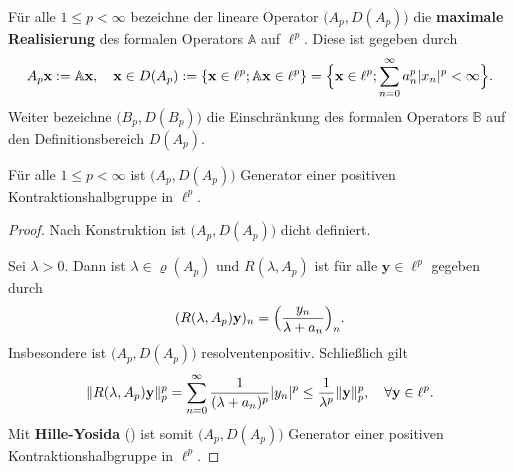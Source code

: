 \begin{defi}
Für alle $1\leq p<\infty$ bezeichne der lineare Operator $\big(A_p, D(A_p)\big)$  %
die \textbf{maximale Realisierung}  des formalen Operators $\mathbb A$ auf $\ell^p$.
Diese ist gegeben durch
\begin{equation*}
A_p\textbf{x}:= \mathbb A\textbf{x}, \quad \textbf{x}\in D(A_p):= \{\textnormal{\textbf{x}}\in \ell^p; \mathbb A\textnormal{\textbf{x}}\in \ell^p\}=\Big\{\textnormal{\textbf{x}}\in \ell^p; \sum_{n=0}^\infty a_n^p |x_n|^p < \infty \Big\}.
\end{equation*}
Weiter bezeichne $\big(B_p, D(B_p)\big)$ die Einschränkung des formalen Operators $\mathbb B$ auf den Definitionsbereich $D(A_p)$.
\end{defi}

\begin{lem}\label{A_p Generator einer Kontraktionshalbgruppe}
Für alle $1\leq p<\infty$ ist $\big(A_p, D(A_p)\big)$ Generator einer positiven Kontraktionshalbgruppe in $\ell^p$.
\end{lem}

\begin{proof}
\par 
Nach Konstruktion ist $\big(A_p, D(A_p)\big)$ dicht definiert. 

\par
Sei $\lambda>0$. Dann ist $\lambda\in \varrho(A_p)$ und $R(\lambda, A_p)$ ist für alle $\textbf{y}\in \ell^p$ gegeben durch
\begin{equation*}
(R(\lambda, A_p)\textnormal{\index{}\textbf y})_n = \Big(\frac{y_n}{\lambda + a_n}\Big)_n.
\end{equation*}
Insbesondere ist $\big(A_p, D(A_p)\big)$  resolventenpositiv. Schließlich gilt
\begin{equation*}
\|R(\lambda, A_p)\textnormal{\index{}\textbf y}\|_p^p = \sum_{n=0}^\infty \frac{1}{(\lambda + a_n)^p}|y_n|^p \leq \frac{1}{\lambda^p}\|\textnormal{\index{}\textbf y}\|_p^p,\quad\forall \textbf{y}\in \ell^p.
\end{equation*}
Mit \textbf{Hille-Yosida} () ist somit $\big(A_p, D(A_p)\big)$ Generator einer positiven Kontraktionshalbgruppe  in $\ell^p$.
\end{proof}



